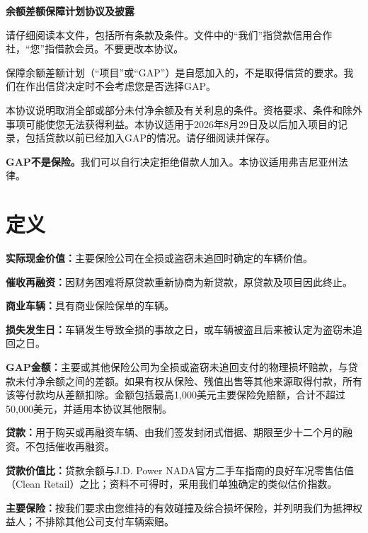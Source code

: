 \documentclass[UTF8,fontset=none,11pt,a4paper]{ctexart}
\begin{document}
{\noindent\fontsize{20}{25}\selectfont\bfseries 余额差额保障计划协议及披露\par}
\vspace{10pt}
请仔细阅读本文件，包括所有条款及条件。文件中的“我们”指贷款信用合作社，“您”指借款会员。不要更\allowbreak\mbox{改本协议。}


保障余额差额计划（“项目”或“GAP”）是自愿加入的，不是取得信贷的要求。我们在作出信贷决定时不会考虑您是否选择GAP。


本协议说明取消全部或部分未付净余额及有关利息的条件。资格要求、条件和除外事项可能使您无法获得利益。本协议适用于2026年8月29日及以后加入项目的记录，包括贷款以前已经加入GAP的情况。请仔细阅\allowbreak\mbox{读并保存。}


\textbf{GAP不是保险。}我们可以自行决定拒绝借款人加入。本协议适用弗吉尼\allowbreak\mbox{亚州法律。}


\section*{定义}
\textbf{实际现金价值：}主要保险公司在全损或盗窃未追回时确定的\allowbreak\mbox{车辆价值。}


\textbf{催收再融资：}因财务困难将原贷款重新协商为新贷款，原贷款及项目\allowbreak\mbox{因此终止。}


\textbf{商业车辆：}具有商业保险保\allowbreak\mbox{单的车辆。}


\textbf{损失发生日：}车辆发生导致全损的事故之日，或车辆被盗且后来被认定为盗窃未\allowbreak\mbox{追回之日。}


\textbf{GAP金额：}主要或其他保险公司为全损或盗窃未追回支付的物理损坏赔款，与贷款未付净余额之间的差额。如果有权从保险、残值出售等其他来源取得付款，所有该等付款均从差额扣除。金额包括最高1,000美元主要保险免赔额，合计不超过50,000美元，并适用本协议\allowbreak\mbox{其他限制。}


\textbf{贷款：}用于购买或再融资车辆、由我们签发封闭式借据、期限至少十二个月的融资。不包括催\allowbreak\mbox{收再融资。}


\textbf{贷款价值比：}贷款余额与J.D. Power NADA官方二手车指南的良好车况零售估值（Clean Retail）之比；资料不可得时，采用我们单独确定的类似估\allowbreak\mbox{价指数。}


\textbf{主要保险：}按我们要求由您维持的有效碰撞及综合损坏保险，并列明我们为抵押权益人；不排除其他公司支付\allowbreak\mbox{车辆索赔。}
\end{document}
